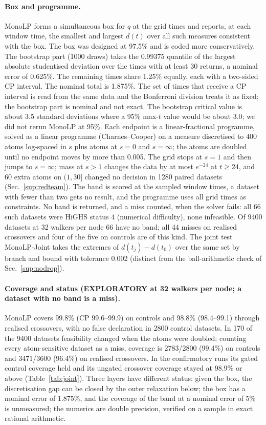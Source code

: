 \documentclass[aps,pre,twocolumn,superscriptaddress,nofootinbib,10pt]{revtex4-2}
\newcommand{\nm}[1]{\textsf{#1}}
\newcommand{\MLP}{\nm{MonoLP}}
\begin{document}
\paragraph*{Box and programme.}
\textsf{MonoLP} forms a simultaneous box for $q$ at the grid times and reports, at each window time, the smallest and largest $d(t)$ over all such measures consistent with the box. The box was designed at 97.5\% and is coded more conservatively. The bootstrap part (1000 draws) takes the 0.99375 quantile of the largest absolute studentised deviation over the times with at least 30 returns, a nominal error of 0.625\%. The remaining times share 1.25\% equally, each with a two-sided CP interval. The nominal total is 1.875\%. The set of times that receive a CP interval is read from the same data and the Bonferroni division treats it as fixed; the bootstrap part is nominal and not exact. The bootstrap critical value is about 3.5 standard deviations where a 95\% max-$t$ value would be about 3.0; we did not rerun \textsf{MonoLP} at 95\%. Each endpoint is a linear-fractional programme, solved as a linear programme (Charnes--Cooper) on a measure discretised to 400 atoms log-spaced in $s$ plus atoms at $s=0$ and $s=\infty$; the atoms are doubled until no endpoint moves by more than 0.005. The grid stops at $s=1$ and then jumps to $s=\infty$; mass at $s>1$ changes the data by at most $e^{-24}$ at $t\ge24$, and 60 extra atoms on $(1,30]$ changed no decision in 1280 paired datasets (Sec.~\ref{sup:redteam}). The band is scored at the sampled window times, a dataset with fewer than two gets no result, and the programme uses all grid times as constraints. No band is returned, and a miss counted, when the solver fails: all 66 such datasets were HiGHS status 4 (numerical difficulty), none infeasible. Of 9400 datasets at 32 walkers per node 66 have no band; all 44 misses on realised crossovers and four of the five on controls are of this kind. The joint test \textsf{MonoLP-Joint} takes the extremes of $d(t_j)-d(t_0)$ over the same set by branch and bound with tolerance 0.002 (distinct from the ball-arithmetic check of Sec.~\ref{sup:nodrop}).

\paragraph*{Coverage and status (EXPLORATORY at 32 walkers per node; a dataset with no band is a miss).}
\MLP{} covers 99.8\% (CP 99.6--99.9) on controls and 98.8\% (98.4--99.1) through realised crossovers, with no false declaration in 2800 control datasets. In 170 of the 9400 datasets feasibility changed when the atoms were doubled; counting every atom-sensitive dataset as a miss, coverage is 2783/2800 (99.4\%) on controls and 3471/3600 (96.4\%) on realised crossovers. In the confirmatory runs its gated control coverage held and its ungated crossover coverage stayed at 98.9\% or above (Table~\ref{tab:joint}). Three layers have different status: given the box, the discretisation gap can be closed by the outer relaxation below; the box has a nominal error of 1.875\%, and the coverage of the band at a nominal error of 5\% is unmeasured; the numerics are double precision, verified on a sample in exact rational arithmetic.
\end{document}
